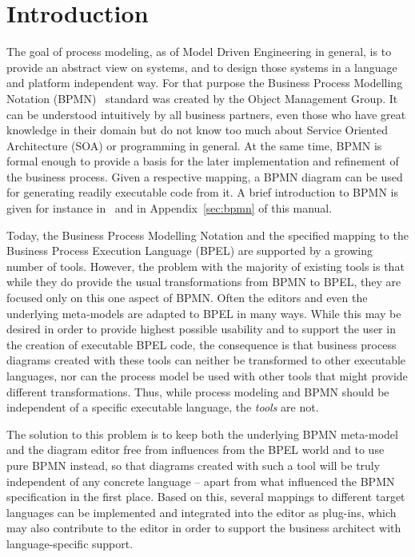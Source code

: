 \chapter{Introduction}


The goal of process modeling, as of Model Driven Engineering in general, is to
provide an abstract view on systems, and to design those systems in a language
and platform independent way.  For that purpose the Business Process Modelling
Notation (BPMN)~\cite{omg2011bpmn2} standard was created by the Object Management
Group.  It can be understood intuitively by all business partners, even those who
have great knowledge in their domain but do not know too much about Service
Oriented Architecture (SOA) or programming in general.  At the same time, BPMN is
formal enough to provide a basis for the later implementation and refinement of
the business process.  Given a respective mapping, a BPMN diagram can be used for
generating readily executable code from it.  A brief introduction to BPMN is given
for instance in~\cite{white2004introduction} and in Appendix~\ref{sec:bpmn} of
this manual.

Today, the Business Process Modelling Notation and the specified mapping to the
Business Process Execution Language (BPEL) are supported by a growing number of
tools.  However, the problem with the majority of existing tools is that while
they do provide the usual transformations from BPMN to BPEL, they are focused
only on this one aspect of BPMN.  Often the editors and even the underlying
meta-models are adapted to BPEL in many ways.  While this may be desired in order
to provide highest possible usability and to support the user in the creation of
executable BPEL code, the consequence is that business process diagrams created
with these tools can neither be transformed to other executable languages, nor
can the process model be used with other tools that might provide different
transformations.  Thus, while process modeling and BPMN should be independent of
a specific executable language, the \emph{tools} are not.

The solution to this problem is to keep both the underlying BPMN meta-model and
the diagram editor free from influences from the BPEL world and to use pure BPMN
instead, so that diagrams created with such a tool will be truly independent of
any concrete language -- apart from what influenced the BPMN specification in
the first place.  Based on this, several mappings to different target languages
can be implemented and integrated into the editor as plug-ins, which may also
contribute to the editor in order to support the business architect with
language-specific support.

